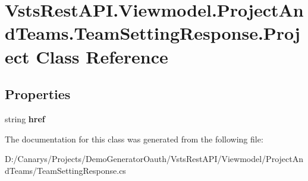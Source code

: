 \hypertarget{class_vsts_rest_a_p_i_1_1_viewmodel_1_1_project_and_teams_1_1_team_setting_response_1_1_project}{}\section{Vsts\+Rest\+A\+P\+I.\+Viewmodel.\+Project\+And\+Teams.\+Team\+Setting\+Response.\+Project Class Reference}
\label{class_vsts_rest_a_p_i_1_1_viewmodel_1_1_project_and_teams_1_1_team_setting_response_1_1_project}
\subsection*{Properties}
\begin{DoxyCompactItemize}
\item 
\mbox{\label{class_vsts_rest_a_p_i_1_1_viewmodel_1_1_project_and_teams_1_1_team_setting_response_1_1_project_a55e065680341841c4a6e3b21e69b2d9d}} 
string {\bfseries href}
\end{DoxyCompactItemize}


The documentation for this class was generated from the following file\+:\begin{DoxyCompactItemize}
\item 
D\+:/\+Canarys/\+Projects/\+Demo\+Generator\+Oauth/\+Vsts\+Rest\+A\+P\+I/\+Viewmodel/\+Project\+And\+Teams/Team\+Setting\+Response.\+cs\end{DoxyCompactItemize}
